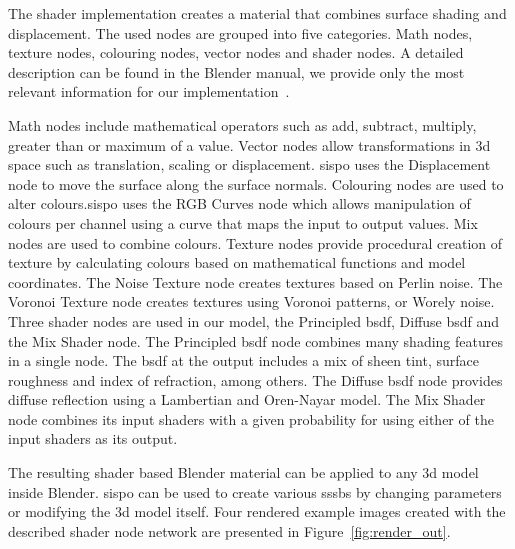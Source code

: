 The shader implementation creates a material that combines surface shading and displacement. The used nodes are grouped into five categories. Math nodes, texture nodes, colouring nodes, vector nodes and shader nodes. A detailed description can be found in the Blender manual, we provide only the most relevant information for our implementation~\cite{IntroductionNodes}.

Math nodes include mathematical operators such as add, subtract, multiply, greater than or maximum of a value. Vector nodes allow transformations in \gls{3d} space such as translation, scaling or displacement. \Gls{sispo} uses the Displacement node to move the surface along the surface normals. Colouring nodes are used to alter colours.\Gls{sispo} uses the RGB Curves node which allows manipulation of colours per channel using a curve that maps the input to output values. Mix nodes are used to combine colours. Texture nodes provide procedural creation of texture by calculating colours based on mathematical functions and model coordinates. The Noise Texture node creates textures based on Perlin noise. The Voronoi Texture node creates textures using Voronoi patterns, or Worely noise. Three shader nodes are used in our model, the Principled \gls{bsdf}, Diffuse \gls{bsdf} and the Mix Shader node. The Principled \gls{bsdf} node combines many shading features in a single node. The \gls{bsdf} at the output includes a mix of sheen tint, surface roughness and index of refraction, among others. The Diffuse \gls{bsdf} node provides diffuse reflection using a Lambertian and Oren-Nayar model. The Mix Shader node combines its input shaders with a given probability for using either of the input shaders as its output.

The resulting shader based Blender material can be applied to any \gls{3d} model inside Blender. \Gls{sispo} can be used to create various \glspl{sssb} by changing parameters or modifying the \gls{3d} model itself. Four rendered example images created with the described shader node network are presented in Figure~\ref{fig:render_out}.

